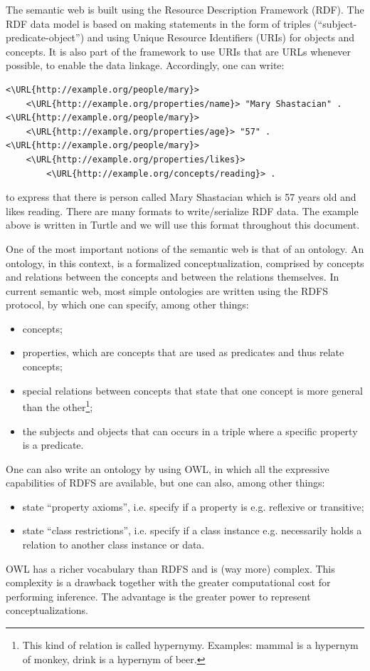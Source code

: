 \documentclass[12pt,fleqn]{article}
\newcommand{\URL}[1]{\url{\detokenize{#1}}}
\begin{document}
The semantic web is built using the Resource Description Framework (RDF).
The RDF data model is based on making statements in the form of triples
(``subject-predicate-object'') and using Unique Resource Identifiers (URIs) for
objects and concepts.
It is also part of the framework to use URIs that are URLs whenever possible,
to enable the data linkage.
Accordingly, one can write:
\begin{Verbatim}[fontsize=\footnotesize,commandchars=\\\{\}]
<\URL{http://example.org/people/mary}>
	<\URL{http://example.org/properties/name}> "Mary Shastacian" .
<\URL{http://example.org/people/mary}>
	<\URL{http://example.org/properties/age}> "57" .
<\URL{http://example.org/people/mary}> 
	<\URL{http://example.org/properties/likes}> 
		<\URL{http://example.org/concepts/reading}> .
\end{Verbatim}
\noindent to express that there is person called Mary Shastacian which is 57 years old and likes reading.
There are many formats to write/serialize RDF data.
The example above is written in Turtle and we will use this format throughout this document.

One of the most important notions of the semantic web is that of an ontology.
An ontology, in this context, is a formalized conceptualization, comprised by
concepts and relations between the concepts and between the relations themselves.
In current semantic web, most simple ontologies are written using the RDFS protocol,
by which one can specify, among other things:
\begin{itemize}
	\item concepts;
	\item properties, which are concepts that are used as predicates and thus relate concepts;
	\item special relations between concepts that state that one concept is more general than the other\footnote{This
		kind of relation is called hypernymy. Examples: mammal is a hypernym of monkey, drink is a hypernym of beer.};
	\item the subjects and objects that can occurs in a triple where a specific property is a predicate.
\end{itemize}

One can also write an ontology by using OWL,
in which all the expressive capabilities of RDFS are
available, but one can also, among other things:
\begin{itemize}
	\item state ``property axioms'', i.e. specify if a property is e.g. reflexive or transitive;
	\item state ``class restrictions'', i.e. specify if a class instance e.g. necessarily holds a relation to another class instance or data.
\end{itemize}
OWL has a richer vocabulary than RDFS and is (way more) complex.
This complexity is a drawback together with the greater computational cost
for performing inference.
The advantage is the greater power to represent conceptualizations.
\end{document}
